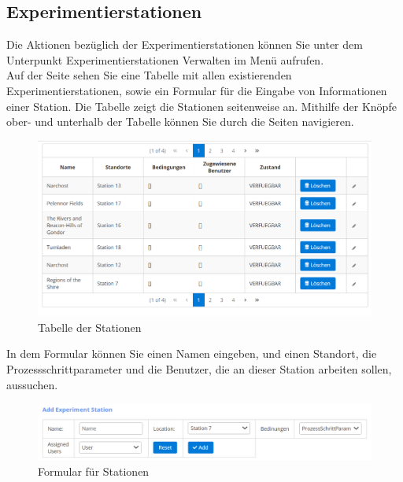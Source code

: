 \documentclass[enabledeprecatedfontcommands,fontsize=12pt,paper=a4,twoside]{scrartcl}
\begin{document}
\subsection{Experimentierstationen}
Die Aktionen bezüglich der Experimentierstationen können Sie unter dem Unterpunkt Experimentierstationen Verwalten im Menü aufrufen. \\
Auf der Seite sehen Sie eine Tabelle mit allen existierenden Experimentierstationen, sowie ein Formular für die Eingabe von Informationen einer Station. Die Tabelle zeigt die Stationen seitenweise an. Mithilfe der Knöpfe ober- und unterhalb der Tabelle können Sie durch die Seiten navigieren. \\

\begin{figure}[h!]
\begin{center}
 \includegraphics[width=\textwidth]{screenshots/admin/stationtabelle.png}
  \caption{Tabelle der Stationen}
  \label{fig:boat2}
\end{center}
\end{figure}

In dem Formular können Sie einen Namen eingeben, und einen Standort, die Prozessschrittparameter und die Benutzer, die an dieser Station arbeiten sollen, aussuchen. \\

\begin{figure}[h!]
\begin{center}
 \includegraphics[width=\textwidth]{screenshots/admin/stationformular.png}
  \caption{Formular für Stationen}
  \label{fig:boat2}
\end{center}
\end{figure}
\end{document}
